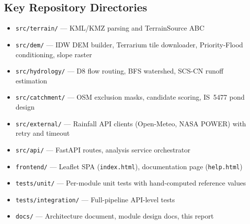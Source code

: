 \documentclass[manuscript,screen,review,nonacm]{acmart}
\begin{document}
\subsection*{Key Repository Directories}
\begin{itemize}
  \item \texttt{src/terrain/} --- KML/KMZ parsing and TerrainSource ABC
  \item \texttt{src/dem/} --- IDW DEM builder, Terrarium tile downloader,
        Priority-Flood conditioning, slope raster
  \item \texttt{src/hydrology/} --- D8 flow routing, BFS watershed, SCS-CN
        runoff estimation
  \item \texttt{src/catchment/} --- OSM exclusion masks, candidate scoring,
        IS~5477 pond design
  \item \texttt{src/external/} --- Rainfall API clients (Open-Meteo, NASA
        POWER) with retry and timeout
  \item \texttt{src/api/} --- FastAPI routes, analysis service orchestrator
  \item \texttt{frontend/} --- Leaflet SPA (\texttt{index.html}),
        documentation page (\texttt{help.html})
  \item \texttt{tests/unit/} --- Per-module unit tests with hand-computed
        reference values
  \item \texttt{tests/integration/} --- Full-pipeline API-level tests
  \item \texttt{docs/} --- Architecture document, module design docs,
        this report
\end{itemize}
\end{document}
